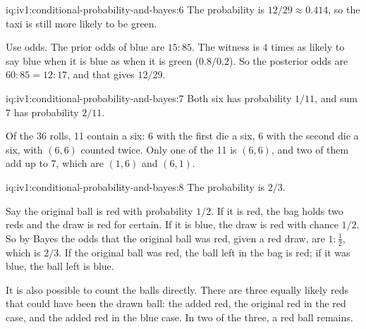\begin{solution}{iq:iv1:conditional-probability-and-bayes:6}
The probability is $12/29 \approx 0.414$, so the taxi is still more likely to be green.

Use odds. The prior odds of blue are $15 : 85$. The witness is 4 times as likely to say blue when it is blue as when it is green ($0.8/0.2$). So the posterior odds are $60 : 85 = 12 : 17$, and that gives $12/29$.

\end{solution}

\begin{solution}{iq:iv1:conditional-probability-and-bayes:7}
Both six has probability $1/11$, and sum 7 has probability $2/11$.

Of the 36 rolls, 11 contain a six: 6 with the first die a six, 6 with the second die a six, with $(6, 6)$ counted twice. Only one of the 11 is $(6, 6)$, and two of them add up to 7, which are $(1, 6)$ and $(6, 1)$.

\end{solution}

\begin{solution}{iq:iv1:conditional-probability-and-bayes:8}
The probability is $2/3$.

Say the original ball is red with probability $1/2$. If it is red, the bag holds two reds and the draw is red for certain. If it is blue, the draw is red with chance $1/2$. So by Bayes the odds that the original ball was red, given a red draw, are $1 : \tfrac12$, which is $2/3$. If the original ball was red, the ball left in the bag is red; if it was blue, the ball left is blue.

It is also possible to count the balls directly. There are three equally likely reds that could have been the drawn ball: the added red, the original red in the red case, and the added red in the blue case. In two of the three, a red ball remains.

\end{solution}

